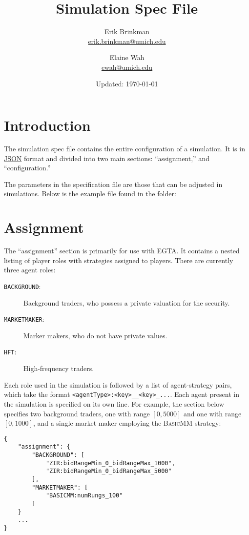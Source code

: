 \documentclass[11pt]{article}
\begin{document}
	
\title{Simulation Spec File}
\author{
  Erik Brinkman \\
  \href{mailto:erik.brinkman@umich.edu}{erik.brinkman@umich.edu}
  \and
  Elaine Wah \\
  \href{mailto:ewah@umich.edu}{ewah@umich.edu}
}
\date{Updated: \today}
\maketitle

\section{Introduction}

The simulation spec file contains the entire configuration of a simulation. It
is in \href{https://en.wikipedia.org/wiki/Json}{JSON} format and divided into
two main sections: ``assignment,'' and ``configuration.''

The parameters in the specification file are those that can be adjusted in
simulations. Below is the example  file found in
the  folder:



\section{Assignment}

The ``assignment'' section is primarily for use with EGTA. It contains a
nested listing of player roles with strategies assigned to players. 
%
There are currently three agent roles:
 \begin{description}
  \item[\texttt{BACKGROUND}:] Background traders, who possess a private valuation for the security.
  \item[\texttt{MARKETMAKER}:] Marker makers, who do not have private values.
  \item[\texttt{HFT}:] High-frequency traders.
  \end{description}

Each role used in the simulation is followed by a list of agent-strategy pairs, which take the format \texttt{<agentType>:<key>\_<value1>\_<key>\_<value2>...}. Each agent present in the simulation is specified on its own line.
%
For example, the section below specifies two background traders, one with range $[0, 5000]$ and one with range $[0, 1000]$, and a single market maker employing the \textsc{BasicMM} strategy:
%
\begin{verbatim}
{
    "assignment": {
        "BACKGROUND": [
            "ZIR:bidRangeMin_0_bidRangeMax_1000",
            "ZIR:bidRangeMin_0_bidRangeMax_5000"
        ],
        "MARKETMAKER": [
            "BASICMM:numRungs_100"
        ]
    }
    ...
}
\end{verbatim}
\end{document}
